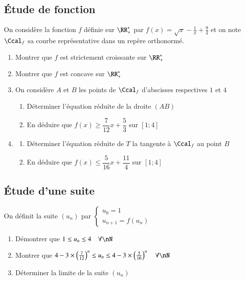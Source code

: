 \documentclass[oneside,12pt]{article}
\begin{document}
\subsection{Étude de fonction}
On considère la fonction $f$ définie sur $\RR_+^*$ par $f(x)=\sqrt{x}-\frac{1}{x}+\frac{9}{4}$ et on note $\Ccal_f$ sa courbe représentative dans un repère orthonormé.
\begin{enumerate}
    \item Montrer que $f$ est strictement croissante sur $\RR_+^*$
    \item Montrer que $f$ est concave sur $\RR_+^*$
    \item On considère $A$ et $B$ les points de $\Ccal_f$ d'abscisses respectives $1$ et $4$
    \begin{enumerate}
        \item Déterminer l'équation réduite de la droite $(AB)$
        \item En déduire que $f(x)\geq\dfrac{7}{12}x+\dfrac{5}{3}$ sur $[1;4]$
    \end{enumerate}
    \item \begin{enumerate}
        \item Déterminer l'équation réduite de $T$ la tangente à $\Ccal_f$ au point $B$
        \item En déduire que $f(x)\leq\dfrac{5}{16}x+\dfrac{11}{4}$ sur $[1;4]$
    \end{enumerate}
\end{enumerate}

\subsection{Étude d'une suite}
On définit la suite $(u_n)$ par $\begin{cases}u_0=1\\u_{n+1}=f(u_n)\end{cases}$

\begin{enumerate}\setlength{\itemsep}{0.5mm}
    \item Démontrer que $1\leq u_n \leq4\quad\forall\nN$
    \item Montrer que $4-3\times\left(\frac{7}{12}\right)^n\leq u_n \leq 4-3\times\left(\frac{5}{16}\right)^n \quad \forall \nN$
    \item Déterminer la limite de la suite $(u_n)$
\end{enumerate}
\end{document}
